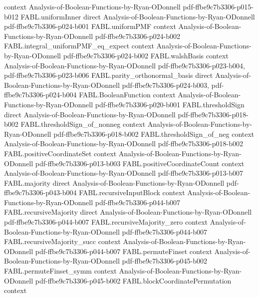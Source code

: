 \begin{theorem}
  {context}
  {Analysis-of-Boolean-Functions-by-Ryan-ODonnell}
  {pdf-ffbe9c7b3306-p015-b012}
\proofstep
  {FABL.uniformInner}
  {direct}
  {Analysis-of-Boolean-Functions-by-Ryan-ODonnell}
  {pdf-ffbe9c7b3306-p024-b001}
\proofstep
  {FABL.uniformPMF}
  {context}
  {Analysis-of-Boolean-Functions-by-Ryan-ODonnell}
  {pdf-ffbe9c7b3306-p024-b002}
\proofstep
  {FABL.integral_uniformPMF_eq_expect}
  {context}
  {Analysis-of-Boolean-Functions-by-Ryan-ODonnell}
  {pdf-ffbe9c7b3306-p024-b002}
\proofstep
  {FABL.walshBasis}
  {context}
  {Analysis-of-Boolean-Functions-by-Ryan-ODonnell}
  {pdf-ffbe9c7b3306-p023-b004,
    pdf-ffbe9c7b3306-p023-b006}
\proofstep
  {FABL.parity_orthonormal_basis}
  {direct}
  {Analysis-of-Boolean-Functions-by-Ryan-ODonnell}
  {pdf-ffbe9c7b3306-p024-b003,
    pdf-ffbe9c7b3306-p024-b004}
\proofstep
  {FABL.BooleanFunction}
  {context}
  {Analysis-of-Boolean-Functions-by-Ryan-ODonnell}
  {pdf-ffbe9c7b3306-p020-b001}
\proofstep
  {FABL.thresholdSign}
  {direct}
  {Analysis-of-Boolean-Functions-by-Ryan-ODonnell}
  {pdf-ffbe9c7b3306-p018-b002}
\proofstep
  {FABL.thresholdSign_of_nonneg}
  {context}
  {Analysis-of-Boolean-Functions-by-Ryan-ODonnell}
  {pdf-ffbe9c7b3306-p018-b002}
\proofstep
  {FABL.thresholdSign_of_neg}
  {context}
  {Analysis-of-Boolean-Functions-by-Ryan-ODonnell}
  {pdf-ffbe9c7b3306-p018-b002}
\proofstep
  {FABL.positiveCoordinateSet}
  {context}
  {Analysis-of-Boolean-Functions-by-Ryan-ODonnell}
  {pdf-ffbe9c7b3306-p013-b003}
\proofstep
  {FABL.positiveCoordinateCount}
  {context}
  {Analysis-of-Boolean-Functions-by-Ryan-ODonnell}
  {pdf-ffbe9c7b3306-p013-b007}
\proofstep
  {FABL.majority}
  {direct}
  {Analysis-of-Boolean-Functions-by-Ryan-ODonnell}
  {pdf-ffbe9c7b3306-p043-b004}
\proofstep
  {FABL.recursiveInputBlock}
  {context}
  {Analysis-of-Boolean-Functions-by-Ryan-ODonnell}
  {pdf-ffbe9c7b3306-p044-b007}
\proofstep
  {FABL.recursiveMajority}
  {direct}
  {Analysis-of-Boolean-Functions-by-Ryan-ODonnell}
  {pdf-ffbe9c7b3306-p044-b007}
\proofstep
  {FABL.recursiveMajority_zero}
  {context}
  {Analysis-of-Boolean-Functions-by-Ryan-ODonnell}
  {pdf-ffbe9c7b3306-p044-b007}
\proofstep
  {FABL.recursiveMajority_succ}
  {context}
  {Analysis-of-Boolean-Functions-by-Ryan-ODonnell}
  {pdf-ffbe9c7b3306-p044-b007}
\proofstep
  {FABL.permuteFinset}
  {context}
  {Analysis-of-Boolean-Functions-by-Ryan-ODonnell}
  {pdf-ffbe9c7b3306-p045-b002}
\proofstep
  {FABL.permuteFinset_symm}
  {context}
  {Analysis-of-Boolean-Functions-by-Ryan-ODonnell}
  {pdf-ffbe9c7b3306-p045-b002}
\proofstep
  {FABL.blockCoordinatePermutation}
  {context}

\end{theorem}
